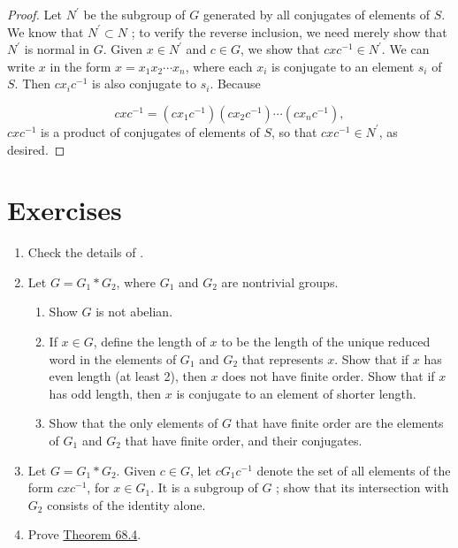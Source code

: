 \begin{proof}
Let \(N^{\prime }\) be the subgroup of \(G\) generated by all conjugates of elements of \(S\). We know that \(N^{\prime } \subset N\) ; to verify the reverse inclusion, we need merely show that \(N^{\prime }\) is normal in \(G\). Given \(x \in {N}^{\prime }\) and \(c \in G\), we show that \({cx}c^{-1} \in {N}^{\prime }\).
We can write \(x\) in the form \(x = x_{1}x_{2}\cdots {x}_{n}\), where each \(x_{i}\) is conjugate to an element \(s_{i}\) of \(S\). Then \(cx_{i}c^{-1}\) is also conjugate to \(s_{i}\). Because

\[
{cx}c^{-1} = ( {cx_{1}c^{-1}}) ( {cx_{2}c^{-1}}) \cdots ( {cx_{n}c^{-1}}),
\]
\({cx}c^{-1}\) is a product of conjugates of elements of \(S\), so that \({cx}c^{-1} \in {N}^{\prime }\), as desired.
\end{proof}
\section*{Exercises}
\begin{enumerate}[itemsep=0.4em, parsep=0pt, topsep=0pt, partopsep=0pt, leftmargin=*, label=\arabic*., ref=\arabic*]
\item Check the details of .
\item Let \(G = G_{1} * G_{2}\), where \(G_{1}\) and \(G_{2}\) are nontrivial groups.
 \begin{enumerate}[itemsep=0.2em, parsep=0pt, topsep=0pt, partopsep=0pt, leftmargin=*, label=(\alph*), align=left]
 \item Show \(G\) is not abelian.
 \item If \(x \in G\), define the length of \(x\) to be the length of the unique reduced word in the elements of \(G_{1}\) and \(G_{2}\) that represents \(x\). Show that if \(x\) has even length (at least 2), then \(x\) does not have finite order. Show that if \(x\) has odd length, then \(x\) is conjugate to an element of shorter length.
 \item Show that the only elements of \(G\) that have finite order are the elements of \(G_{1}\) and \(G_{2}\) that have finite order, and their conjugates.
 \end{enumerate}
\item Let \(G = G_{1} * G_{2}\). Given \(c \in G\), let \(cG_{1}c^{-1}\) denote the set of all elements of the form \({cx}c^{-1}\), for \(x \in {G}_{1}\). It is a subgroup of \(G\) ; show that its intersection with \(G_{2}\) consists of the identity alone.
\item Prove \hyperref[thm:68.4]{Theorem 68.4}.
\end{enumerate}

